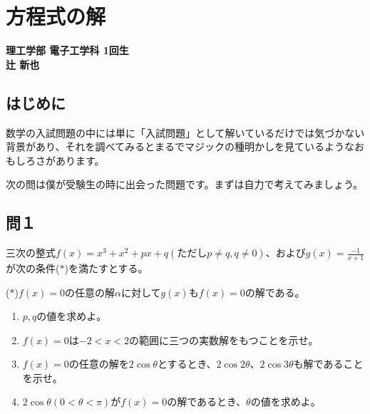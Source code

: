 \chapter{方程式の解}
\vspace{-45pt} %
\begin{flushright}
  {\bf \large 理工学部 電子工学科 1回生} \\ \vspace{3pt} %
  {\bf \large 辻 新也} \\ \vspace{30pt} %
\end{flushright}

\section*{はじめに}
数学の入試問題の中には単に「入試問題」として解いているだけでは気づかない背景があり、それを調べてみるとまるでマジックの種明かしを見ているようなおもしろさがあります。\par
次の問は僕が受験生の時に出会った問題です。まずは自力で考えてみましょう。

%
\section*{問１}

\begin{screen}
三次の整式$f(x) = x^3 + x^2 +px +q(ただしp \neq q,q \neq 0)$、および$g(x) = \frac{-1}{x+1}$が次の条件($\ast$)を満たすとする。
\begin{center}
  ($\ast$)\quad $f(x) = 0$の任意の解$\alpha$に対して$g(x)$も$f(x) = 0$の解である。
\end{center}
\begin{enumerate}
  \item $p,q$の値を求めよ。
  \item $f(x) = 0$は$-2<x<2$の範囲に三つの実数解をもつことを示せ。
  \item $f(x) = 0$の任意の解を$2 \cos \theta$とするとき、$2\cos 2\theta 、2 \cos 3\theta$も解であることを示せ。
  \item $2\cos \theta (0<\theta<\pi)$が$f(x) = 0$の解であるとき、$\theta$の値を求めよ。
\end{enumerate}
\end{screen}
%
